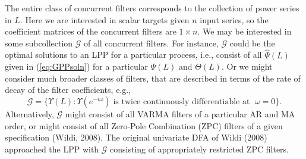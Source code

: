 \documentclass[a4paper]{book}
\begin{document}
 The entire class of concurrent filters corresponds to 
  the collection of power series in $L$.  Here we are interested in 
 scalar targets given $n$ input series, so the coefficient matrices of the
 concurrent filters are $1 \times n$.  We may be interested in some subcollection
 $\mathcal{G}$ of all concurrent filters.  For instance, $\mathcal{G}$ could
 be the optimal solutions to an LPP for a particular process, i.e., consist of
 all $\widehat{\Psi} (L)$ given in (\ref{eq:GPPsoln}) for a particular $\Psi (L)$ and
 $\Theta (L)$.  Or we might consider much broader classes of filters, that are 
 described in terms of the rate of decay of the filter coefficients, e.g.,
\[
  \mathcal{G} = \{ \Upsilon (L) : \Upsilon (e^{-i \omega}) \;
  \mbox{is twice continuously differentiable at } \; \omega = 0 \}.
\]
  Alternatively, $\mathcal{G}$ might consist of all VARMA filters of a
 particular AR and MA order, or might consist of all Zero-Pole
 Combination (ZPC) filters of a given specification (Wildi, 2008).
 The original univariate DFA of Wildi (2008) approached the LPP with
 $\mathcal{G}$ consisting of appropriately restricted ZPC filters.
\end{document}
